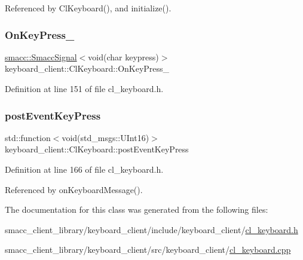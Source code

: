 Referenced by Cl\+Keyboard(), and initialize().

\mbox{\label{classkeyboard__client_1_1ClKeyboard_a0fcb5b4432b26b8c8ca6924e8e82fbeb}} 
\subsubsection{\texorpdfstring{On\+Key\+Press\+\_\+}{OnKeyPress\_}}
{\footnotesize\ttfamily \hyperlink{classsmacc_1_1SmaccSignal}{smacc\+::\+Smacc\+Signal}$<$void(char keypress)$>$ keyboard\+\_\+client\+::\+Cl\+Keyboard\+::\+On\+Key\+Press\+\_\+}



Definition at line 151 of file cl\+\_\+keyboard.\+h.

\mbox{\label{classkeyboard__client_1_1ClKeyboard_aadd675eea47a012b348a4e6c00e7e9d0}} 
\subsubsection{\texorpdfstring{post\+Event\+Key\+Press}{postEventKeyPress}}
{\footnotesize\ttfamily std\+::function$<$void(std\+\_\+msgs\+::\+U\+Int16)$>$ keyboard\+\_\+client\+::\+Cl\+Keyboard\+::post\+Event\+Key\+Press}



Definition at line 166 of file cl\+\_\+keyboard.\+h.



Referenced by on\+Keyboard\+Message().



The documentation for this class was generated from the following files\+:\begin{DoxyCompactItemize}
\item 
smacc\+\_\+client\+\_\+library/keyboard\+\_\+client/include/keyboard\+\_\+client/\hyperlink{cl__keyboard_8h}{cl\+\_\+keyboard.\+h}\item 
smacc\+\_\+client\+\_\+library/keyboard\+\_\+client/src/keyboard\+\_\+client/\hyperlink{cl__keyboard_8cpp}{cl\+\_\+keyboard.\+cpp}\end{DoxyCompactItemize}
